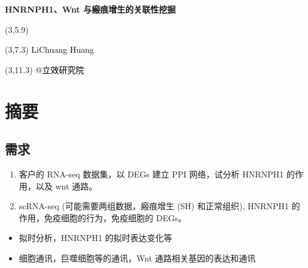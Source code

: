 \documentclass[
]{article}
\author{}
\date{\vspace{-2.5em}}
\providecommand{\tightlist}{%
  \setlength{\itemsep}{0pt}\setlength{\parskip}{0pt}}
\begin{document}
\begin{titlepage} 
\begin{center} \textbf{\Huge HNRNPH1、Wnt
与瘢痕增生的关联性挖掘} \vspace{4em}
\begin{textblock}{10}(3,5.9) \huge
\textbf{\textcolor{white}{2024-05-10}}
\end{textblock} \begin{textblock}{10}(3,7.3)
\Large \textcolor{black}{LiChuang Huang}
\end{textblock} \begin{textblock}{10}(3,11.3)
\Large \textcolor{black}{@立效研究院}
\end{textblock} \end{center} \end{titlepage}
\restoregeometry


\tableofcontents

\listoffigures

\listoftables

\newpage


\hypertarget{abstract}{%
\section{摘要}\label{abstract}}

\hypertarget{ux9700ux6c42}{%
\subsection{需求}\label{ux9700ux6c42}}

\begin{enumerate}
\def\labelenumi{\arabic{enumi}.}
\tightlist
\item
  客户的 RNA-seq 数据集，以 DEGs 建立 PPI 网络，试分析 HNRNPH1 的作用，以及 wnt 通路。
\item
  scRNA-seq (可能需要两组数据，瘢痕增生 (SH) 和正常组织), HNRNPH1 的作用，免疫细胞的行为，免疫细胞的 DEGs。
\end{enumerate}

\begin{itemize}
\tightlist
\item
  拟时分析，HNRNPH1 的拟时表达变化等
\item
  细胞通讯，巨噬细胞等的通讯，Wnt 通路相关基因的表达和通讯
\end{itemize}
\end{document}
